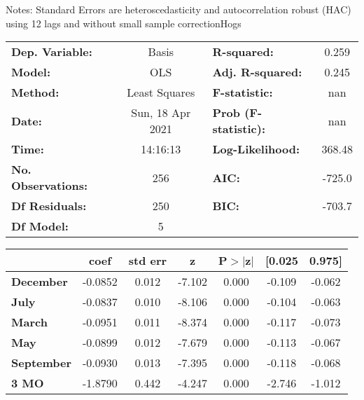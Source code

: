 Notes: \newline
 [1] Standard Errors are heteroscedasticity and autocorrelation robust (HAC) using 12 lags and without small sample correctionHogs\begin{center}
\begin{tabular}{lclc}
\toprule
\textbf{Dep. Variable:}    &      Basis       & \textbf{  R-squared:         } &     0.259   \\
\textbf{Model:}            &       OLS        & \textbf{  Adj. R-squared:    } &     0.245   \\
\textbf{Method:}           &  Least Squares   & \textbf{  F-statistic:       } &       nan   \\
\textbf{Date:}             & Sun, 18 Apr 2021 & \textbf{  Prob (F-statistic):} &      nan    \\
\textbf{Time:}             &     14:16:13     & \textbf{  Log-Likelihood:    } &    368.48   \\
\textbf{No. Observations:} &         256      & \textbf{  AIC:               } &    -725.0   \\
\textbf{Df Residuals:}     &         250      & \textbf{  BIC:               } &    -703.7   \\
\textbf{Df Model:}         &           5      & \textbf{                     } &             \\
\bottomrule
\end{tabular}
\begin{tabular}{lcccccc}
                   & \textbf{coef} & \textbf{std err} & \textbf{z} & \textbf{P$> |$z$|$} & \textbf{[0.025} & \textbf{0.975]}  \\
\midrule
\textbf{December}  &      -0.0852  &        0.012     &    -7.102  &         0.000        &       -0.109    &       -0.062     \\
\textbf{July}      &      -0.0837  &        0.010     &    -8.106  &         0.000        &       -0.104    &       -0.063     \\
\textbf{March}     &      -0.0951  &        0.011     &    -8.374  &         0.000        &       -0.117    &       -0.073     \\
\textbf{May}       &      -0.0899  &        0.012     &    -7.679  &         0.000        &       -0.113    &       -0.067     \\
\textbf{September} &      -0.0930  &        0.013     &    -7.395  &         0.000        &       -0.118    &       -0.068     \\
\textbf{3 MO}      &      -1.8790  &        0.442     &    -4.247  &         0.000        &       -2.746    &       -1.012     \\

\end{tabular}
\end{center}
